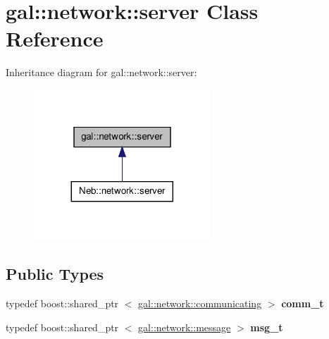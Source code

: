 \hypertarget{classgal_1_1network_1_1server}{\section{gal\-:\-:network\-:\-:server \-Class \-Reference}
\label{classgal_1_1network_1_1server}
}


\-Inheritance diagram for gal\-:\-:network\-:\-:server\-:\nopagebreak
\begin{figure}[H]
\begin{center}
\leavevmode
\includegraphics[width=188pt]{classgal_1_1network_1_1server__inherit__graph}
\end{center}
\end{figure}
\subsection*{\-Public \-Types}
\begin{DoxyCompactItemize}
\item 
\hypertarget{classgal_1_1network_1_1server_afc42ccc2573292ca287f04329e90c393}{typedef boost\-::shared\-\_\-ptr\*
$<$ \hyperlink{classgal_1_1network_1_1communicating}{gal\-::network\-::communicating} $>$ {\bfseries comm\-\_\-t}}\label{classgal_1_1network_1_1server_afc42ccc2573292ca287f04329e90c393}

\item 
\hypertarget{classgal_1_1network_1_1server_a381a33367a621576ca4c839bef2e49bd}{typedef boost\-::shared\-\_\-ptr\*
$<$ \hyperlink{classgal_1_1network_1_1message}{gal\-::network\-::message} $>$ {\bfseries msg\-\_\-t}}\label{classgal_1_1network_1_1server_a381a33367a621576ca4c839bef2e49bd}

\end{DoxyCompactItemize}
